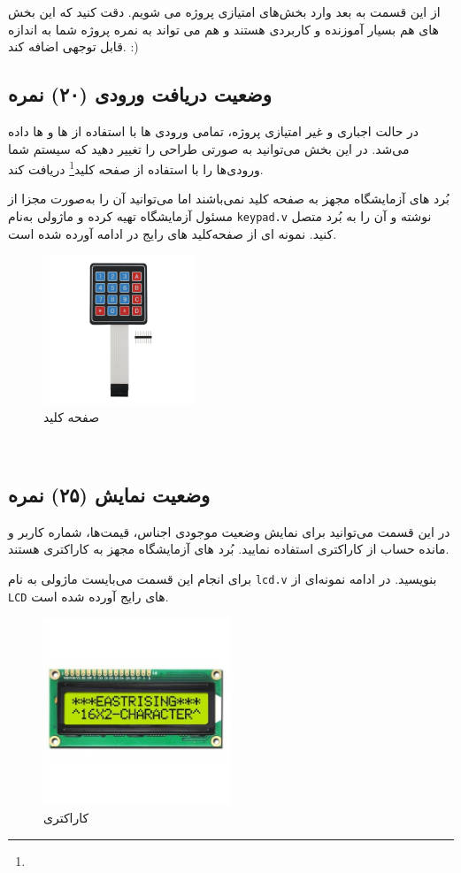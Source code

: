 \documentclass[]{article}
\begin{document}
از این قسمت به بعد وارد بخش‌های امتیازی پروژه می شویم. دقت کنید که این بخش های هم بسیار آموزنده و کاربردی هستند و هم می تواند به نمره پروژه شما به اندازه قابل توجهی اضافه کند. :)


\subsection*{{\titr وضعیت دریافت ورودی} (۲۰) نمره}
در حالت اجباری و غیر امتیازی پروژه، تمامی ورودی ها با استفاده از  ها و  ها داده می‌شد. در این بخش می‌توانید به صورتی طراحی را تغییر دهید که سیستم شما ورودی‌ها را با استفاده از صفحه کلید\footnote{} دریافت کند.

بُرد های آزمایشگاه مجهز به صفحه کلید نمی‌باشند اما می‌توانید آن را به‌صورت مجزا از مسئول آزمایشگاه تهیه کرده و ماژولی به‌نام \texttt{keypad.v} نوشته و آن را به بُرد متصل کنید. نمونه ای از صفحه‌کلید های رایج در ادامه آورده شده است.


\begin{figure}[h]
	\centering
	\includegraphics[width=0.4\textwidth]{images/keypad.png}
	\caption{صفحه کلید}
	\label{صفحه کلید}
\end{figure}




\newpage
\Large \textbf{\\
}




\subsection*{{\titr وضعیت نمایش} (۲۵) نمره}
در این قسمت می‌توانید برای نمایش وضعیت موجودی اجناس، قیمت‌ها، شماره کاربر و مانده حساب از  کاراکتری استفاده نمایید. بُرد های آزمایشگاه مجهز به  کاراکتری هستند. 

برای انجام این قسمت می‌بایست ماژولی به نام \texttt{lcd.v} بنویسید. در ادامه نمونه‌ای از \texttt{LCD} های رایج آورده شده است.


\begin{figure}[h]
	\centering
	\includegraphics[width=0.5\textwidth]{images/lcd.jpg}
	\caption{ کاراکتری}
	\label{LCD کاراکتری}
\end{figure}
\end{document}

